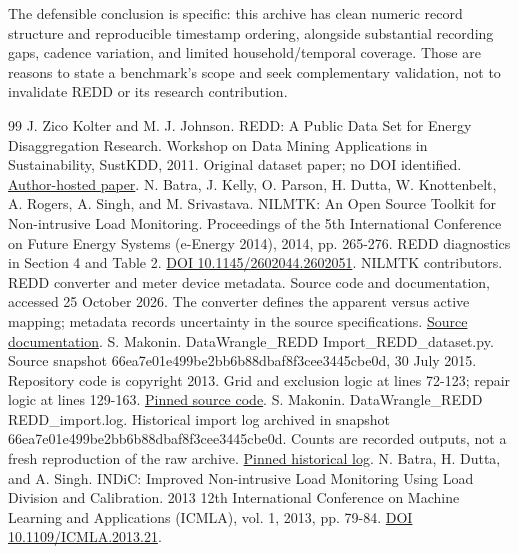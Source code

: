 \documentclass[11pt,letterpaper]{article}
\begin{document}
The defensible conclusion is specific: this archive has clean numeric record structure and reproducible timestamp ordering, alongside substantial recording gaps, cadence variation, and limited household/temporal coverage. Those are reasons to state a benchmark's scope and seek complementary validation, not to invalidate REDD or its research contribution.
\clearpage\begingroup\small\raggedright
\begin{thebibliography}{99}\setlength{\itemsep}{4pt}
 J. Zico Kolter and M. J. Johnson. REDD: A Public Data Set for Energy Disaggregation Research. Workshop on Data Mining Applications in Sustainability, SustKDD, 2011. Original dataset paper; no DOI identified. \href{https://zicokolter.com/publications/kolter2011redd.pdf}{Author-hosted paper}.
 N. Batra, J. Kelly, O. Parson, H. Dutta, W. Knottenbelt, A. Rogers, A. Singh, and M. Srivastava. NILMTK: An Open Source Toolkit for Non-intrusive Load Monitoring. Proceedings of the 5th International Conference on Future Energy Systems (e-Energy 2014), 2014, pp. 265-276. REDD diagnostics in Section 4 and Table 2. \href{https://doi.org/10.1145/2602044.2602051}{DOI 10.1145/2602044.2602051}.
 NILMTK contributors. REDD converter and meter device metadata. Source code and documentation, accessed 25 October 2026. The converter defines the apparent versus active mapping; metadata records uncertainty in the source specifications. \href{https://github.com/nilmtk/nilmtk/tree/master/nilmtk/dataset_converters/redd}{Source documentation}.
 S. Makonin. DataWrangle\_REDD Import\_REDD\_dataset.py. Source snapshot 66ea7e01e499be2bb6b88dbaf8f3cee3445cbe0d, 30 July 2015. Repository code is copyright 2013. Grid and exclusion logic at lines 72-123; repair logic at lines 129-163. \href{https://github.com/smakonin/DataWrangle_REDD/blob/66ea7e01e499be2bb6b88dbaf8f3cee3445cbe0d/Import_REDD_dataset.py}{Pinned source code}.
 S. Makonin. DataWrangle\_REDD REDD\_import.log. Historical import log archived in snapshot 66ea7e01e499be2bb6b88dbaf8f3cee3445cbe0d. Counts are recorded outputs, not a fresh reproduction of the raw archive. \href{https://github.com/smakonin/DataWrangle_REDD/blob/66ea7e01e499be2bb6b88dbaf8f3cee3445cbe0d/REDD_import.log}{Pinned historical log}.
 N. Batra, H. Dutta, and A. Singh. INDiC: Improved Non-intrusive Load Monitoring Using Load Division and Calibration. 2013 12th International Conference on Machine Learning and Applications (ICMLA), vol. 1, 2013, pp. 79-84. \href{https://doi.org/10.1109/ICMLA.2013.21}{DOI 10.1109/ICMLA.2013.21}.

\end{thebibliography}
\end{document}
